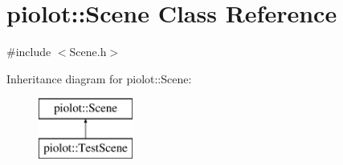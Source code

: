 \hypertarget{classpiolot_1_1_scene}{}\section{piolot\+:\+:Scene Class Reference}
\label{classpiolot_1_1_scene}


{\ttfamily \#include $<$Scene.\+h$>$}

Inheritance diagram for piolot\+:\+:Scene\+:\begin{figure}[H]
\begin{center}
\leavevmode
\includegraphics[height=2.000000cm]{classpiolot_1_1_scene}
\end{center}
\end{figure}
